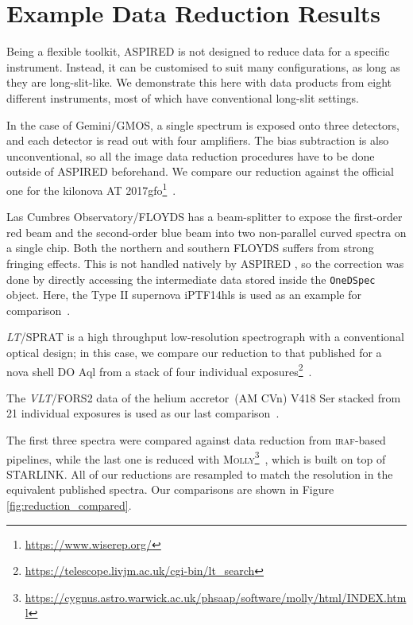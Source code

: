 \documentclass[linenumbers, twocolumn]{aastex631}
\begin{document}
\section{Example Data Reduction Results}
\label{sec:examples}
Being a flexible toolkit, \textsc{ASPIRED} is not designed to reduce data for a
specific instrument. Instead, it can be customised to suit many configurations,
as long as they are long-slit-like. We demonstrate this here with data products
from eight different instruments, most of which have conventional long-slit
settings. 

In the case of Gemini/GMOS, a single spectrum is exposed onto
three detectors, and each detector is read out with four amplifiers. The bias 
subtraction is also unconventional, so all the image data reduction procedures
have to be done outside of \textsc{ASPIRED} beforehand. We compare our reduction against
the official one for the kilonova AT 2017gfo\footnote{\url{https://www.wiserep.org/}}~\citep{2017ApJ...848L..32M}. 

Las Cumbres
Observatory/FLOYDS has a beam-splitter to expose
the first-order red beam and the second-order blue beam into two non-parallel
curved spectra on a single chip. Both the northern and southern FLOYDS suffers
from strong fringing effects. This is not handled natively by \textsc{ASPIRED} ,
so the correction was done by directly accessing the intermediate data stored
inside the \texttt{OneDSpec} object. Here, the Type II supernova iPTF14hls is used as an example for comparison~\citep{2017Natur.551..210A}.

\textit{LT}/SPRAT is a high throughput low-resolution spectrograph with
a conventional optical design; in this case, we compare our reduction to that published for a nova 
shell DO Aql from a stack of four individual 
exposures\footnote{\url{https://telescope.livjm.ac.uk/cgi-bin/lt_search}}~\citep{2020MNRAS.499.2959H}. 

The \textit{VLT}/FORS2 data
of the helium accretor~(AM CVn) V418 Ser stacked from 21 individual exposures is
used as our last comparison~\citep{2020MNRAS.496.1243G}. 

The first three spectra were 
compared against data reduction from \textsc{iraf}-based pipelines, while the
last one is reduced with \textsc{Molly}\footnote{
\url{https://cygnus.astro.warwick.ac.uk/phsaap/software/molly/html/INDEX.html}}~\citep{2019ascl.soft07012M},
which is built on top of \textsc{STARLINK}. All of our reductions are resampled to match
the resolution in the equivalent published spectra. Our comparisons are shown in Figure \ref{fig:reduction_compared}.
\end{document}
